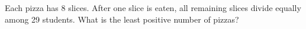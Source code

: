 Each pizza has 8 slices. After one slice is eaten, all remaining slices divide equally among 29 students. What is the least positive number of pizzas?
